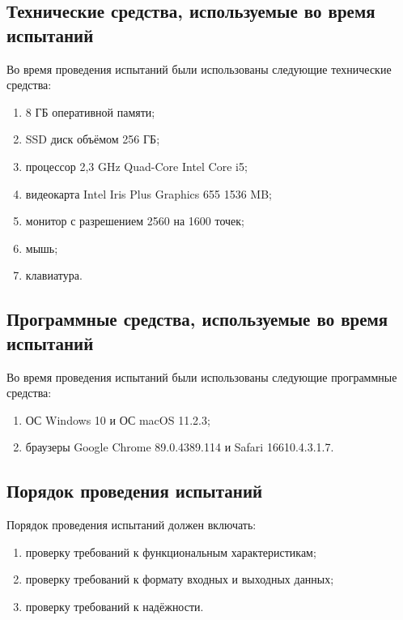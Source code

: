 \documentclass{../../includes/TechDoc}
\begin{document}
    \subsection{Технические средства, используемые во время испытаний}

    Во время проведения испытаний были использованы следующие технические средства:

    \begin{enumerate}
        \item 8 ГБ оперативной памяти;
        \item SSD диск объёмом 256 ГБ;
        \item процессор 2,3 GHz Quad-Core Intel Core i5;
        \item видеокарта Intel Iris Plus Graphics 655 1536 MB;
        \item монитор с разрешением 2560 на 1600 точек;
        \item мышь;
        \item клавиатура.
    \end{enumerate}

    \subsection{Программные средства, используемые во время испытаний}

    Во время проведения испытаний были использованы следующие программные средства:
    
    \begin{enumerate}
        \item ОС Windows 10 и ОС macOS 11.2.3;
        \item браузеры Google Chrome 89.0.4389.114 и Safari 16610.4.3.1.7.
    \end{enumerate}

    \subsection{Порядок проведения испытаний}

    Порядок проведения испытаний должен включать:

    \begin{enumerate}
        \item проверку требований к функциональным характеристикам;
        \item проверку требований к формату входных и выходных данных;
        \item проверку требований к надёжности.
    \end{enumerate}
\end{document}
